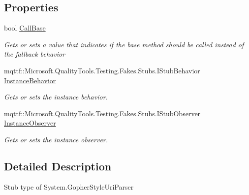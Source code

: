 \subsection*{Properties}
\begin{DoxyCompactItemize}
\item 
bool \hyperlink{class_system_1_1_fakes_1_1_stub_gopher_style_uri_parser_a7003921342be1783d3c81c8a6fa53ffb}{Call\-Base}
\begin{DoxyCompactList}\small\item\em Gets or sets a value that indicates if the base method should be called instead of the fallback behavior\end{DoxyCompactList}\item 
mqttf\-::\-Microsoft.\-Quality\-Tools.\-Testing.\-Fakes.\-Stubs.\-I\-Stub\-Behavior \hyperlink{class_system_1_1_fakes_1_1_stub_gopher_style_uri_parser_a3992112bf103b1cbf51621bbc79e54d9}{Instance\-Behavior}
\begin{DoxyCompactList}\small\item\em Gets or sets the instance behavior.\end{DoxyCompactList}\item 
mqttf\-::\-Microsoft.\-Quality\-Tools.\-Testing.\-Fakes.\-Stubs.\-I\-Stub\-Observer \hyperlink{class_system_1_1_fakes_1_1_stub_gopher_style_uri_parser_abdb798fd113a85b07a068b29bab26b73}{Instance\-Observer}
\begin{DoxyCompactList}\small\item\em Gets or sets the instance observer.\end{DoxyCompactList}\end{DoxyCompactItemize}


\subsection{Detailed Description}
Stub type of System.\-Gopher\-Style\-Uri\-Parser



